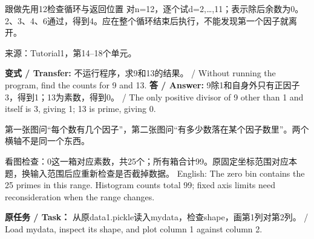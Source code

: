 \begin{StudyBlock}{跟做}{先用12检查循环与返回位置}
对n=12，逐个试d=2,…,11；表示除后余数为0。2、3、4、6通过，得到4。应在整个循环结束后执行，不能发现第一个因子就离开。
\end{StudyBlock}


来源：Tutorial1，第14–18个单元。








\textbf{变式 / Transfer:} 不运行程序，求9和13的结果。 / Without running the program, find the counts for 9 and 13.
\textbf{答 / Answer:} 9除1和自身外只有正因子3，得到1；13为素数，得到0。 / The only positive divisor of 9 other than 1 and itself is 3, giving 1; 13 is prime, giving 0.


第一张图问“每个数有几个因子”，第二张图问“有多少数落在某个因子数里”。两个横轴不是同一个东西。












看图检查：0这一箱对应素数，共25个；所有箱合计99。原固定坐标范围对应本题，换输入范围后应重新检查是否截掉数据。
English: The zero bin contains the 25 primes in this range. Histogram counts total 99; fixed axis limits need reconsideration when the range changes.







\textbf{原任务 / Task：} 从原data1.pickle读入mydata，检查shape，画第1列对第2列。 / Load mydata, inspect its shape, and plot column 1 against column 2.



